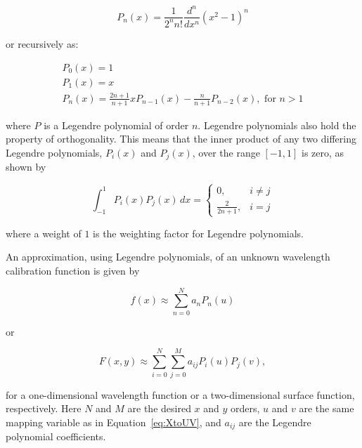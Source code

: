 \begin{equation}
  P_{n}(x) = \frac{1}{2^{n} n!} \frac{d^{n}}{d x^{n}} (x^{2} - 1)^{n}
  \label{eq:legpolyexplicit}
\end{equation}

\noindent or recursively as:

\begin{equation}
  \begin{gathered}
    P_{0}(x) = 1 \\
    P_{1}(x) = x \\
    P_{n}(x) = \frac{2 n + 1}{n + 1} x P_{n - 1}(x) - \frac{n}{n + 1} P_{n - 2}(x), \text{ for } n > 1
  \end{gathered}
  \label{eq:legpoly}
\end{equation}

\noindent where $P$ is a Legendre polynomial of order $n$. Legendre polynomials also hold the property of orthogonality. This means that the inner product of any two differing Legendre polynomials, $P_{i}(x)$ and $P_{j}(x)$, over the range $[-1, 1]$ is zero, as shown by

\begin{equation}
  \int_{-1}^{1} P_{i}(x) P_{j}(x) \,dx =
  \begin{cases}
    0,                 & i \neq j \\
    \frac{2}{2 n + 1}, & i = j
  \end{cases}
  \label{eq:legorth}
\end{equation}

\noindent where a weight of $1$ is the weighting factor for Legendre polynomials.
\prgph

An approximation, using Legendre polynomials, of an unknown wavelength calibration function is given by

\begin{equation}
  f(x) \approx \sum_{n = 0}^{N} a_{n} P_{n}(u)
  \label{eq:legendre}
\end{equation}

\noindent or

\begin{equation}
  F(x, y) \approx \sum_{i = 0}^{N} \sum_{j = 0}^{M} a_{ij} P_{i}(u) P_{j}(v),
  \label{eq:Legendre2D}
\end{equation}

\noindent for a one-dimensional wavelength function or a two-dimensional surface function, respectively. Here $N$ and $M$ are the desired $x$ and $y$ orders, $u$ and $v$ are the same mapping variable as in Equation~\ref{eq:XtoUV}, and $a_{ij}$ are the Legendre polynomial coefficients.
\prgph

